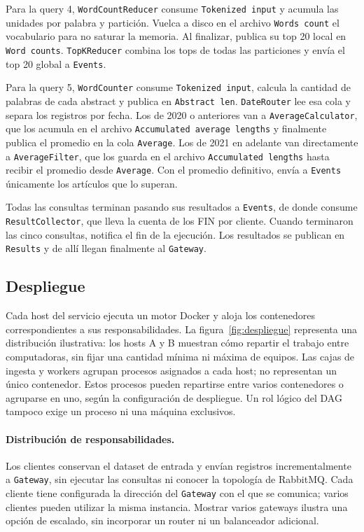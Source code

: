 Para la query 4,  \texttt{WordCountReducer} consume  \texttt{Tokenized input} y acumula las unidades por palabra y partición. Vuelca a disco en el archivo  \texttt{Words count} el vocabulario para no saturar la memoria. Al finalizar, publica su top 20 local en  \texttt{Word counts}.  \texttt{TopKReducer} combina los tops de todas las particiones y envía el top 20 global a  \texttt{Events}.

Para la query 5,   \texttt{WordCounter} consume  \texttt{Tokenized input}, calcula la cantidad de palabras de cada abstract y publica en  \texttt{Abstract len}.  \texttt{DateRouter} lee esa cola y separa los registros por fecha. Los de 2020 o anteriores van a  \texttt{AverageCalculator}, que los acumula en el archivo  \texttt{Accumulated average lengths} y finalmente publica el promedio en la cola  \texttt{Average}. Los de 2021 en adelante van directamente a  \texttt{AverageFilter}, que los guarda en el archivo  \texttt{Accumulated lengths} hasta recibir el promedio desde  \texttt{Average}. Con el promedio definitivo, envía a  \texttt{Events} únicamente los artículos que lo superan.

Todas las consultas terminan pasando sus resultados a  \texttt{Events}, de donde consume  \texttt{ResultCollector}, que lleva la cuenta de los FIN por cliente. Cuando terminaron las cinco consultas, notifica el fin de la ejecución. Los resultados se publican en  \texttt{Results} y de allí llegan finalmente al  \texttt{Gateway}.


\subsection{Despliegue}
\label{subsec:despliegue}

Cada host del servicio ejecuta un motor Docker y aloja los contenedores
correspondientes a sus responsabilidades. La figura~\ref{fig:despliegue}
representa una distribución ilustrativa: los hosts A y B muestran cómo repartir
el trabajo entre computadoras, sin fijar una cantidad mínima ni máxima de
equipos. Las cajas de ingesta y workers agrupan procesos asignados a cada host;
no representan un único contenedor. Estos procesos pueden repartirse entre
varios contenedores o agruparse en uno, según la configuración de despliegue.
Un rol lógico del DAG tampoco exige un proceso ni una máquina exclusivos.

\paragraph{Distribución de responsabilidades.}
Los clientes conservan el dataset de entrada y envían registros incrementalmente
a \texttt{Gateway}, sin ejecutar las consultas ni conocer la topología de
RabbitMQ. Cada cliente tiene configurada la dirección del \texttt{Gateway}
con el que se comunica; varios clientes pueden utilizar la misma instancia.
Mostrar varios gateways ilustra una opción de escalado, sin incorporar un
router ni un balanceador adicional.

